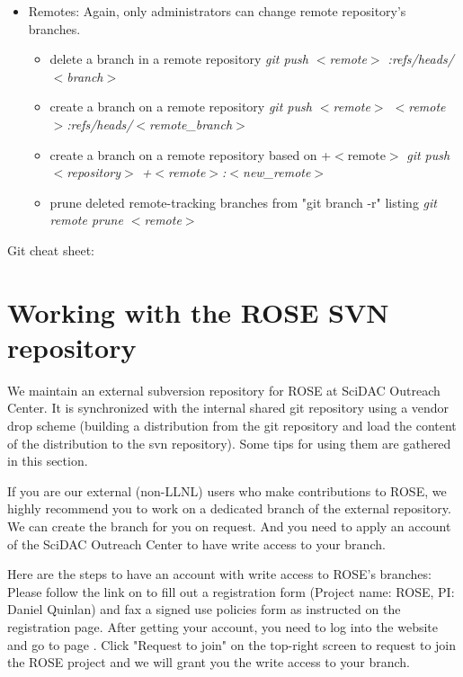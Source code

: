 \begin{itemize}
\item Remotes: Again, only administrators can change remote repository's branches.
   \begin{itemize}
       \item delete a branch in a remote repository \textit{git push $<$remote$>$ :refs/heads/$<$branch$>$}
       \item create a branch on a remote repository \textit{git push $<$remote$>$ $<$remote$>$:refs/heads/$<$remote\_branch$>$}
       \item create a branch on a remote repository based on +$<$remote$>$ \textit{git push $<$repository$>$ +$<$remote$>$:$<$new\_remote$>$}
       \item prune deleted remote-tracking branches from "git branch -r" listing \textit{ git remote prune $<$remote$>$ }
   \end{itemize}
\end{itemize}
Git cheat sheet: 



 \section{Working with the ROSE SVN repository}%
\label{gettingStarted::svn}
We maintain an external subversion repository for ROSE at SciDAC Outreach
Center. It is synchronized with the internal shared git repository using a
vendor drop scheme (building a distribution from the git repository and
load the content of the distribution to the svn repository). 
Some tips for using them are gathered in this section. 

If you are our external (non-LLNL) users who make contributions to ROSE,
we highly recommend you to work on a dedicated branch of the external repository. 
We can create the branch for you on request. And you need to apply an account of
the SciDAC Outreach Center to have write access to your branch. 

Here are the steps to have an account with write access to ROSE's branches:
Please follow the link on
to fill out a registration form (Project name: ROSE, PI: Daniel Quinlan)
and fax a signed use policies form as instructed on the registration page.
After getting your account, you need to log into the website and go to page
.
Click "Request to join" on the top-right screen to request to join the ROSE
project and we will grant you the write access to your branch. 

